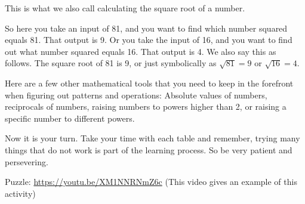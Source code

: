 \documentclass{article}
\begin{document}
This is what we also call calculating the square root of a number.

So here you take an input of 81, and you want to find which number
squared equals 81. That output is 9. Or you take the input of 16, and
you want to find out what number squared equals 16.  That output is
4. We also say this as follows. The square root of 81 is 9, or just
symbolically as \(\sqrt{81} = 9\) or \(\sqrt{16} = 4\).

Here are a few other mathematical tools that you need to keep in the
forefront when figuring out patterns and operations: Absolute values
of numbers, reciprocals of numbers, raising numbers to powers higher
than 2, or raising a specific number to different powers.

Now it is your turn. Take your time with each table and remember,
trying many things that do not work is part of the learning
process. So be very patient and persevering.

Puzzle:
\url{https://youtu.be/XM1NNRNmZ6c} (This video gives an example of this activity)
\end{document}
